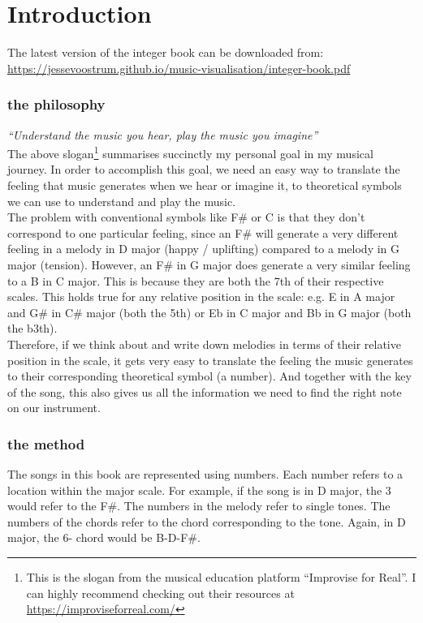 

\section*{Introduction}


The latest version of the integer book can be downloaded from: \url{https://jessevoostrum.github.io/music-visualisation/integer-book.pdf}

\subsubsection*{the philosophy}
\textit{“Understand the music you hear, play the music you imagine”} \\

\noindent The above slogan\footnote{This is the slogan from the musical education platform “Improvise for Real”. I can highly recommend checking out their resources at \url{https://improviseforreal.com/}} summarises succinctly my personal goal in my musical journey. In order to accomplish this goal, we need an easy way to translate the feeling that music generates when we hear or imagine it, to theoretical symbols we can use to understand and play the music. \\

\noindent The problem with conventional symbols like F\# or C is that they don't correspond to one particular feeling, since an F\# will generate a very different feeling in a melody in D major (happy / uplifting) compared to a melody in G major (tension). However, an F\# in G major does generate a very similar feeling to a B in C major. This is because they are both the 7th of their respective scales.  This holds true for any relative position in the scale: e.g. E in A major and G\# in C\# major (both the 5th) or Eb in C major and Bb in G major (both the b3th). \\

\noindent Therefore, if we think about and write down melodies in terms of their relative position in the scale, it gets very easy to translate the feeling the music generates to their corresponding theoretical symbol (a number). And together with the key of the song, this also gives us all the information we need to find the right note on our instrument. 

\subsubsection*{the method}
The songs in this book are represented using numbers. Each number refers to a location within the major scale. For example, if the song is in D major, the 3 would refer to the F\#. The numbers in the melody refer to single tones. The numbers of the chords refer to the chord corresponding to the tone. Again, in D major, the 6- chord would be B-D-F\#.  

